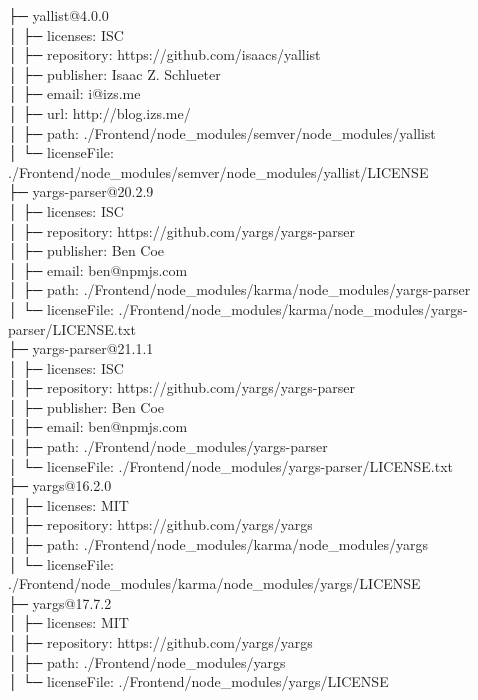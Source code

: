├─ yallist@4.0.0\\
│  ├─ licenses: ISC\\
│  ├─ repository: https://github.com/isaacs/yallist\\
│  ├─ publisher: Isaac Z. Schlueter\\
│  ├─ email: i@izs.me\\
│  ├─ url: http://blog.izs.me/\\
│  ├─ path: ./Frontend/node\_modules/semver/node\_modules/yallist\\
│  └─ licenseFile: ./Frontend/node\_modules/semver/node\_modules/yallist/LICENSE\\
├─ yargs-parser@20.2.9\\
│  ├─ licenses: ISC\\
│  ├─ repository: https://github.com/yargs/yargs-parser\\
│  ├─ publisher: Ben Coe\\
│  ├─ email: ben@npmjs.com\\
│  ├─ path: ./Frontend/node\_modules/karma/node\_modules/yargs-parser\\
│  └─ licenseFile: ./Frontend/node\_modules/karma/node\_modules/yargs-parser/LICENSE.txt\\
├─ yargs-parser@21.1.1\\
│  ├─ licenses: ISC\\
│  ├─ repository: https://github.com/yargs/yargs-parser\\
│  ├─ publisher: Ben Coe\\
│  ├─ email: ben@npmjs.com\\
│  ├─ path: ./Frontend/node\_modules/yargs-parser\\
│  └─ licenseFile: ./Frontend/node\_modules/yargs-parser/LICENSE.txt\\
├─ yargs@16.2.0\\
│  ├─ licenses: MIT\\
│  ├─ repository: https://github.com/yargs/yargs\\
│  ├─ path: ./Frontend/node\_modules/karma/node\_modules/yargs\\
│  └─ licenseFile: ./Frontend/node\_modules/karma/node\_modules/yargs/LICENSE\\
├─ yargs@17.7.2\\
│  ├─ licenses: MIT\\
│  ├─ repository: https://github.com/yargs/yargs\\
│  ├─ path: ./Frontend/node\_modules/yargs\\
│  └─ licenseFile: ./Frontend/node\_modules/yargs/LICENSE\\
